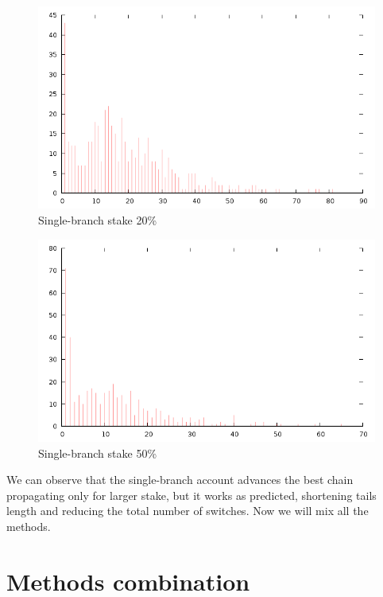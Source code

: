 \documentclass[12pt]{article}
\begin{document}
\begin{figure}[H]
\centering
\caption{Single-branch stake 20\%}
\includegraphics[scale=0.6]{changes-s20n0k1.png}
\end{figure} 

\begin{figure}[H]
\centering
\caption{Single-branch stake 50\%}
\includegraphics[scale=0.6]{changes-s50n0k1.png}
\end{figure} 

We can observe that the single-branch account advances the best chain propagating only for larger stake, but it works as predicted, shortening tails length
and reducing the total number of switches. Now we will mix all the methods.

\section{Methods combination}
\end{document}
